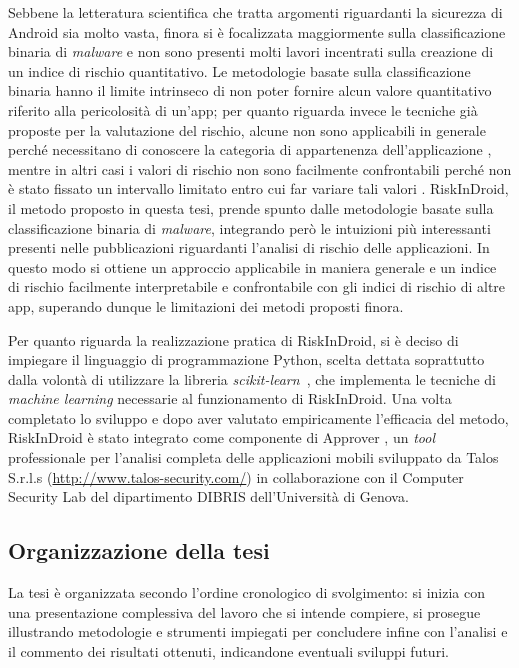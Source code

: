 \documentclass[12pt,a4paper,oneside]{article}
\begin{document}
Sebbene la letteratura scientifica che tratta argomenti riguardanti la sicurezza di Android sia molto vasta, finora si è focalizzata maggiormente sulla classificazione binaria di \textit{malware} e non sono presenti molti lavori incentrati sulla creazione di un indice di rischio quantitativo. Le metodologie basate sulla classificazione binaria hanno il limite intrinseco di non poter fornire alcun valore quantitativo riferito alla pericolosità di un'app; per quanto riguarda invece le tecniche già proposte per la valutazione del rischio, alcune non sono applicabili in generale perché necessitano di conoscere la categoria di appartenenza dell'applicazione \cite{ROTARU,CATEGORICAL_RISK}, mentre in altri casi i valori di rischio non sono facilmente confrontabili perché non è stato fissato un intervallo limitato entro cui far variare tali valori \cite{WANG_QUANTITATIVE}. RiskInDroid, il metodo proposto in questa tesi, prende spunto dalle metodologie basate sulla classificazione binaria di \textit{malware}, integrando però le intuizioni più interessanti presenti nelle pubblicazioni riguardanti l'analisi di rischio delle applicazioni. In questo modo si ottiene un approccio applicabile in maniera generale e un indice di rischio facilmente interpretabile e confrontabile con gli indici di rischio di altre app, superando dunque le limitazioni dei metodi proposti finora.

Per quanto riguarda la realizzazione pratica di RiskInDroid, si è deciso di impiegare il linguaggio di programmazione Python, scelta dettata soprattutto dalla volontà di utilizzare la libreria \mbox{\textit{scikit-learn}}~\cite{SCIKIT}, che implementa le tecniche di \textit{machine learning} necessarie al funzionamento di RiskInDroid. Una volta completato lo sviluppo e dopo aver valutato empiricamente l'efficacia del metodo, RiskInDroid è stato integrato come componente di Approver \cite{APPROVER}, un \textit{tool} professionale per l'analisi completa delle applicazioni mobili sviluppato da Talos S.r.l.s (\url{http://www.talos-security.com/}) in collaborazione con il Computer Security Lab del dipartimento DIBRIS dell'Università di Genova.



\subsection{Organizzazione della tesi}
La tesi è organizzata secondo l'ordine cronologico di svolgimento: si inizia con una presentazione complessiva del lavoro che si intende compiere, si prosegue illustrando metodologie e strumenti impiegati per concludere infine con l'analisi e il commento dei risultati ottenuti, indicandone eventuali sviluppi futuri.
\end{document}
